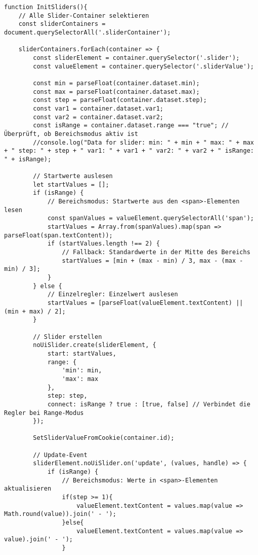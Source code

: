 \begin{lstlisting}[style=JavaScript]
function InitSliders(){
    // Alle Slider-Container selektieren
    const sliderContainers = document.querySelectorAll('.sliderContainer');

    sliderContainers.forEach(container => {
        const sliderElement = container.querySelector('.slider');
        const valueElement = container.querySelector('.sliderValue');

        const min = parseFloat(container.dataset.min);
        const max = parseFloat(container.dataset.max);
        const step = parseFloat(container.dataset.step);
        const var1 = container.dataset.var1;
        const var2 = container.dataset.var2;
        const isRange = container.dataset.range === "true"; // Überprüft, ob Bereichsmodus aktiv ist
        //console.log("Data for slider: min: " + min + " max: " + max + " step: " + step + " var1: " + var1 + " var2: " + var2 + " isRange: " + isRange);

        // Startwerte auslesen
        let startValues = [];
        if (isRange) {
            // Bereichsmodus: Startwerte aus den <span>-Elementen lesen
            const spanValues = valueElement.querySelectorAll('span');
            startValues = Array.from(spanValues).map(span => parseFloat(span.textContent));
            if (startValues.length !== 2) {
                // Fallback: Standardwerte in der Mitte des Bereichs
                startValues = [min + (max - min) / 3, max - (max - min) / 3];
            }
        } else {
            // Einzelregler: Einzelwert auslesen
            startValues = [parseFloat(valueElement.textContent) || (min + max) / 2];
        }

        // Slider erstellen
        noUiSlider.create(sliderElement, {
            start: startValues,
            range: {
                'min': min,
                'max': max
            },
            step: step,
            connect: isRange ? true : [true, false] // Verbindet die Regler bei Range-Modus
        });

        SetSliderValueFromCookie(container.id);

        // Update-Event
        sliderElement.noUiSlider.on('update', (values, handle) => {
            if (isRange) {
                // Bereichsmodus: Werte in <span>-Elementen aktualisieren
                if(step >= 1){
                    valueElement.textContent = values.map(value => Math.round(value)).join(' - ');
                }else{
                    valueElement.textContent = values.map(value => value).join(' - ');
                }


\end{lstlisting}
